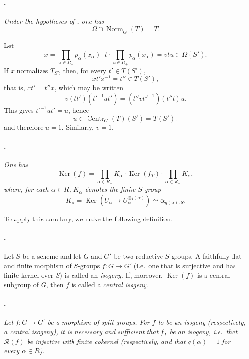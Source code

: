 \paragraph{.}
\textit{Under the hypotheses of , one has}
\[
  \Omega\cap\underline{\operatorname{Norm}}_G(T)=T.
\]

Let
\[
  x=
  \prod_{\alpha\in R_-}p_\alpha(x_\alpha)
  \mathbin{\cdot}t\mathbin{\cdot}
  \prod_{\alpha\in R_+}p_\alpha(x_\alpha)
  =
  vtu
  \in\Omega(S').
\]
If \(x\) normalizes \(T_{S'}\), then, for every \(t'\in T(S')\),
\[
  xt'x^{-1}=t''\in T(S'),
\]
that is, \(xt'=t''x\), which may be written
\[
  v(tt')(t'^{-1}ut')
  =
  (t''vt''^{-1})(t''t)u.
\]
This gives \(t'^{-1}ut'=u\), hence
\[
  u\in\operatorname{Centr}_G(T)(S')=T(S'),
\]
and therefore \(u=1\). Similarly, \(v=1\).

\paragraph{.}
\textit{One has}
\[
  \operatorname{Ker}(f)
  =
  \prod_{\alpha\in R_-}K_\alpha
  \mathbin{\cdot}\operatorname{Ker}(f_T)\mathbin{\cdot}
  \prod_{\alpha\in R_+}K_\alpha,
\]
\textit{where, for each \(\alpha\in R\), \(K_\alpha\) denotes the
finite \(S\)-group}
\[
  K_\alpha
  =
  \operatorname{Ker}\!\left(
    U_\alpha\longrightarrow U_\alpha^{\otimes q(\alpha)}
  \right)
  \simeq
  \boldsymbol{\alpha}_{q(\alpha),S}.
\]

To apply this corollary, we make the following definition.

\paragraph{.}
Let \(S\) be a scheme and let \(G\) and \(G'\) be two reductive
\(S\)-groups. A faithfully flat and finite morphism of \(S\)-groups
\(f:G\to G'\) \textup{(i.e.\ one that is surjective and has finite
kernel over \(S\))} is called an \emph{isogeny}. If, moreover,
\(\operatorname{Ker}(f)\) is a central subgroup of \(G\), then \(f\)
is called a \emph{central isogeny}.

\paragraph{.}
\textit{Let \(f:G\to G'\) be a morphism of split groups. For \(f\)
to be an isogeny \textup{(respectively, a central isogeny)}, it is
necessary and sufficient that \(f_T\) be an isogeny, i.e.\ that
\(\mathscr R(f)\) be injective with finite cokernel
\textup{(respectively, and that \(q(\alpha)=1\) for every
\(\alpha\in R\))}.}

